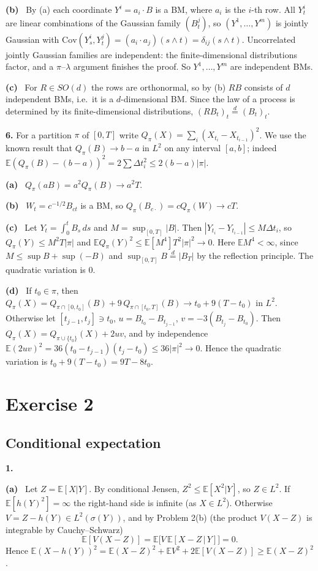 \documentclass[11pt,a4paper]{article}
\newcommand{\E}{\mathbb{E}}
\newcommand{\1}{\mathbf{1}}
\newcommand{\prob}[1]{\par\medskip\noindent\textbf{#1}\quad}
\newcommand{\sub}[1]{\par\smallskip\noindent\textbf{#1}\ }
\begin{document}
\sub{(b)} By (a) each coordinate $Y^i=a_i\cdot B$ is a BM, where $a_i$ is the $i$-th row. All $Y^i_t$ are linear combinations of the
Gaussian family $(B^j_t)$, so $(Y^1,\dots,Y^m)$ is jointly Gaussian with
$\mathrm{Cov}(Y^i_s,Y^j_t)=(a_i\cdot a_j)(s\wedge t)=\delta_{ij}(s\wedge t)$. Uncorrelated jointly Gaussian
families are independent: the finite-dimensional distributions factor, and a $\pi$--$\lambda$
argument finishes the proof. So $Y^1,\dots,Y^m$ are independent BMs.

\sub{(c)} For $R\in SO(d)$ the rows are orthonormal, so by (b) $RB$ consists of $d$ independent BMs, i.e.\
it is a $d$-dimensional BM. Since the law of a process is determined by its finite-dimensional distributions,
$(RB_t)_t\overset{d}{=}(B_t)_t$.

\prob{6.}
For a partition $\pi$ of $[0,T]$ write $Q_\pi(X)=\sum_i(X_{t_i}-X_{t_{i-1}})^2$. We use the known result
that $Q_\pi(B)\to b-a$ in $L^2$ on any interval $[a,b]$; indeed
$\E(Q_\pi(B)-(b-a))^2=2\sum\Delta t_i^2\le2(b-a)|\pi|$.

\sub{(a)} $Q_\pi(aB)=a^2Q_\pi(B)\to a^2T$.

\sub{(b)} $W_t=c^{-1/2}B_{ct}$ is a BM, so $Q_\pi(B_{c\cdot})=cQ_\pi(W)\to cT$.

\sub{(c)} Let $Y_t=\int_0^tB_s\,ds$ and $M=\sup_{[0,T]}|B|$. Then $|Y_{t_i}-Y_{t_{i-1}}|\le M\Delta t_i$, so
$Q_\pi(Y)\le M^2T|\pi|$ and $\E Q_\pi(Y)^2\le\E[M^4]T^2|\pi|^2\to0$. Here $\E M^4<\infty$, since
$M\le\sup B+\sup(-B)$ and $\sup_{[0,T]}B\overset d=|B_T|$ by the reflection principle. The quadratic variation is $0$.

\sub{(d)} If $t_0\in\pi$, then $Q_\pi(X)=Q_{\pi\cap[0,t_0]}(B)+9\,Q_{\pi\cap[t_0,T]}(B)\to t_0+9(T-t_0)$ in $L^2$.
Otherwise let $[t_{j-1},t_j]\ni t_0$, $u=B_{t_0}-B_{t_{j-1}}$, $v=-3(B_{t_j}-B_{t_0})$. Then
$Q_\pi(X)=Q_{\pi\cup\{t_0\}}(X)+2uv$, and by independence
$\E(2uv)^2=36(t_0-t_{j-1})(t_j-t_0)\le 36|\pi|^2\to0$. Hence the quadratic variation is $t_0+9(T-t_0)=9T-8t_0$.

\section*{Exercise 2}
\subsection*{Conditional expectation}

\prob{1.}
\sub{(a)} Let $Z=\E[X|Y]$. By conditional Jensen, $Z^2\le\E[X^2|Y]$, so $Z\in L^2$. If
$\E[h(Y)^2]=\infty$ the right-hand side is infinite (as $X\in L^2$). Otherwise $V=Z-h(Y)\in
L^2(\sigma(Y))$, and by Problem 2(b) (the product $V(X-Z)$ is integrable by Cauchy--Schwarz)
\[
\E[V(X-Z)]=\E\big[V\,\E[X-Z\,|\,Y]\big]=0 .
\]
Hence $\E(X-h(Y))^2=\E(X-Z)^2+\E V^2+2\E[V(X-Z)]\ge\E(X-Z)^2$.
\end{document}
